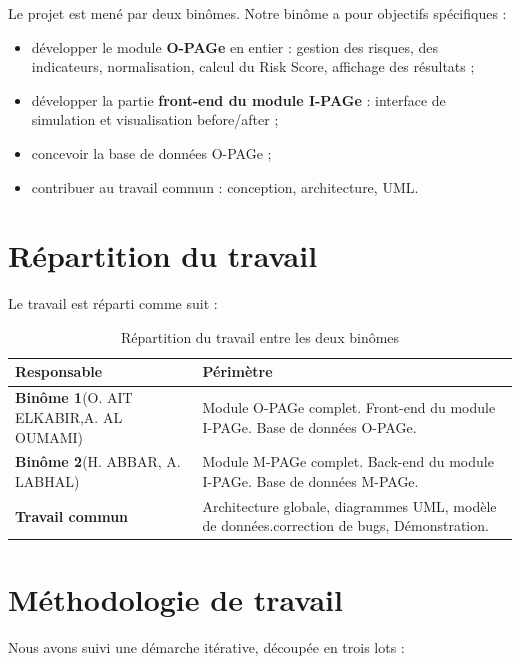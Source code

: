 Le projet est mené par deux binômes. Notre binôme a pour objectifs spécifiques :
\begin{itemize}
    \item développer le module \textbf{O-PAGe} en entier : gestion des risques, des indicateurs, normalisation, calcul du Risk Score, affichage des résultats ;
    \item développer la partie \textbf{front-end du module I-PAGe} : interface de simulation et visualisation before/after ;
    \item concevoir la base de données O-PAGe ;
    \item contribuer au travail commun : conception, architecture, UML.
\end{itemize}
\section{Répartition du travail}
Le travail est réparti comme suit :

\begin{table}[h]
\centering
\renewcommand{\arraystretch}{1.35}
\begin{tabular}{@{}p{}p{}@{}}
\hline
\textbf{Responsable} & \textbf{Périmètre} \\
\hline
\textbf{Binôme 1}\newline (O. AIT ELKABIR,\newline A. AL OUMAMI) &
    Module O-PAGe complet.\newline
    Front-end du module I-PAGe.\newline
    Base de données O-PAGe. \\
\hline
\textbf{Binôme 2}\newline (H. ABBAR, A. LABHAL) &
    Module M-PAGe complet.\newline
    Back-end du module I-PAGe.\newline
    Base de données M-PAGe. \\
\hline
\textbf{Travail commun} &
    Architecture globale, diagrammes UML, modèle de données.\newline correction de bugs, Démonstration. \\
\hline
\end{tabular}
\caption{Répartition du travail entre les deux binômes}
\end{table}
\section{Méthodologie de travail}
Nous avons suivi une démarche itérative, découpée en trois lots :

